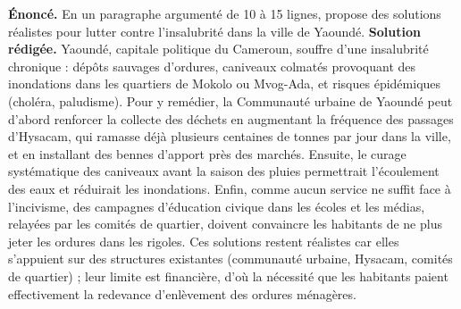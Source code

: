 \documentclass[11pt]{article}
\begin{document}
\begin{exoresolu}
\textbf{Énoncé.} En un paragraphe argumenté de 10 à 15 lignes, propose des solutions réalistes pour lutter contre l'insalubrité dans la ville de Yaoundé.
\tcblower
\textbf{Solution rédigée.} Yaoundé, capitale politique du Cameroun, souffre d'une insalubrité chronique : dépôts sauvages d'ordures, caniveaux colmatés provoquant des inondations dans les quartiers de Mokolo ou Mvog-Ada, et risques épidémiques (choléra, paludisme). Pour y remédier, la Communauté urbaine de Yaoundé peut d'abord renforcer la collecte des déchets en augmentant la fréquence des passages d'Hysacam, qui ramasse déjà plusieurs centaines de tonnes par jour dans la ville, et en installant des bennes d'apport près des marchés. Ensuite, le curage systématique des caniveaux avant la saison des pluies permettrait l'écoulement des eaux et réduirait les inondations. Enfin, comme aucun service ne suffit face à l'incivisme, des campagnes d'éducation civique dans les écoles et les médias, relayées par les comités de quartier, doivent convaincre les habitants de ne plus jeter les ordures dans les rigoles. Ces solutions restent réalistes car elles s'appuient sur des structures existantes (communauté urbaine, Hysacam, comités de quartier) ; leur limite est financière, d'où la nécessité que les habitants paient effectivement la redevance d'enlèvement des ordures ménagères.
\end{exoresolu}
\end{document}
